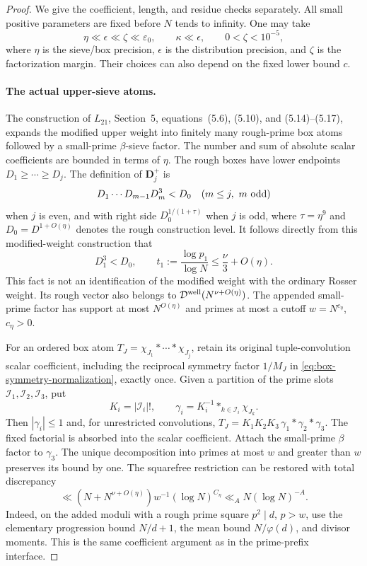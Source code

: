 \documentclass[11pt]{article}
\begin{document}
\begin{proof}
We give the coefficient, length, and residue checks separately.
All small positive parameters are fixed before $N$ tends to infinity.
One may take
\[
 \eta\ll\epsilon\ll\zeta\ll\varepsilon_0,\qquad
 \kappa\ll\epsilon,
 \qquad 0<\zeta<10^{-5},
\]
where $\eta$ is the sieve/box precision, $\epsilon$ is the
distribution precision, and $\zeta$ is the factorization margin.
Their choices can also depend on the fixed lower bound $c$.

\paragraph{The actual upper-sieve atoms.}
The construction of $L_{21}$, Section~5, equations~(5.6), (5.10),
and (5.14)--(5.17), expands the modified upper weight into finitely
many rough-prime box atoms followed by a small-prime $\beta$-sieve
factor. The number and sum of absolute scalar coefficients are
bounded in terms of $\eta$. The rough boxes have lower endpoints
$D_1\ge\cdots\ge D_j$. The definition of $\mathbf D_j^+$ is
\[
 D_1\cdots D_{m-1}D_m^3<D_0
       \quad(m\le j,\ m\ {\rm odd})
\]
when $j$ is even, and with right side $D_0^{1/(1+\tau)}$
when $j$ is odd, where $\tau=\eta^9$ and
$D_0=D^{1+O(\eta)}$ denotes the rough construction level.
It follows directly from this modified-weight construction that
\[
 D_1^3<D_0,\qquad
 t_1:=\frac{\log p_1}{\log N}\le\frac{\nu}{3}+O(\eta).
\]
This fact is not an identification of the modified weight with
the ordinary Rosser weight. Its rough vector also belongs to
$\mathcal D^{\rm well}(N^{\nu+O(\eta)})$.
The appended small-prime factor has support at most $N^{O(\eta)}$
and primes at most a cutoff $w=N^{c_\eta}$, $c_\eta>0$.

For an ordered box atom $T_J=\chi_{J_1}*\cdots*\chi_{J_j}$,
retain its original tuple-convolution scalar coefficient, including
the reciprocal symmetry factor $1/M_J$ in
\eqref{eq:box-symmetry-normalization}, exactly once. Given a partition of the prime slots
$\mathcal I_1,\mathcal I_2,\mathcal I_3$, put
\[
 K_i=|\mathcal I_i|!,\qquad
 \gamma_i=K_i^{-1}\mathop{*}_{k\in\mathcal I_i}\chi_{J_k}.
\]
Then $|\gamma_i|\le1$ and, for unrestricted convolutions,
$T_J=K_1K_2K_3\,\gamma_1*\gamma_2*\gamma_3$.
The fixed factorial is absorbed into the scalar coefficient.
Attach the small-prime $\beta$ factor to $\gamma_3$.
The unique decomposition into primes at most $w$ and greater
than $w$ preserves its bound by one.
The squarefree restriction can be restored with total discrepancy
\[
 \ll (N+N^{\nu+O(\eta)})w^{-1}(\log N)^{C_\eta}
      \ll_A N(\log N)^{-A}.
\]
Indeed, on the added moduli with a rough prime square $p^2\mid d$,
$p>w$, use the elementary progression bound $N/d+1$, the mean
bound $N/\varphi(d)$, and divisor moments. This is the same
coefficient argument as in the prime-prefix interface.


\end{proof}
\end{document}
